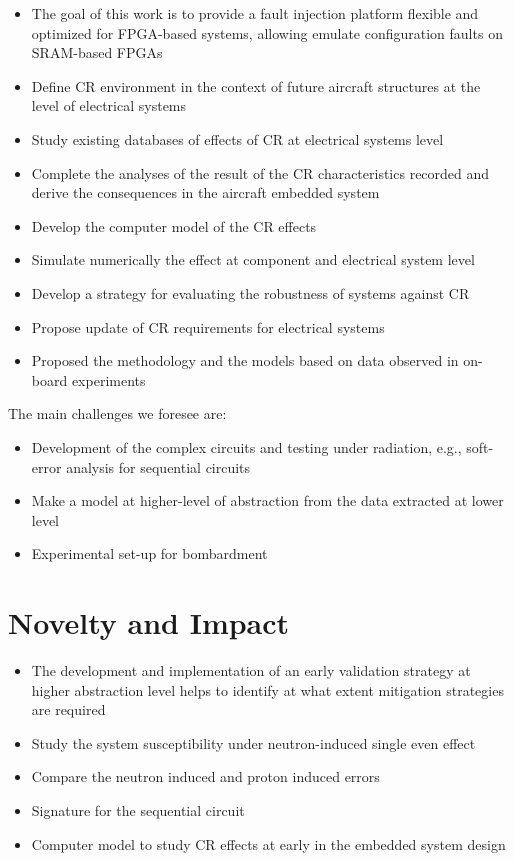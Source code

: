 \begin{itemize}
\item The goal of this work is to provide a fault injection platform flexible and optimized for
FPGA-based systems, allowing emulate configuration faults on SRAM-based FPGAs

\item Define CR environment in the context of future aircraft structures  at the level of electrical systems
\item Study existing databases of effects of CR at electrical systems level
\item Complete the analyses of the result of the CR characteristics recorded and derive the consequences in the aircraft embedded system
\item Develop the computer model of the CR effects
\item Simulate numerically the effect at component and electrical system level
\item Develop a strategy for evaluating the robustness of systems against CR
\item Propose update of CR requirements for electrical systems
\item Proposed the methodology and the models based on data observed in on-board experiments


\end{itemize}



The main challenges we foresee are:
\begin{itemize}
\item Development of the complex circuits and testing under radiation, e.g., soft-error analysis for sequential circuits
\item Make a model at higher-level of abstraction from the data extracted at lower level 
\item Experimental set-up for bombardment

\end{itemize}


  

\section{Novelty and Impact}


\begin{itemize}
\item The development and implementation of an early validation strategy at higher abstraction level helps to identify at what extent mitigation strategies are required
\item Study the system susceptibility under neutron-induced single even effect
\item Compare the neutron induced and proton induced errors
\item Signature for the sequential circuit
\item Computer model to study CR effects at early in the embedded system design
\end{itemize}


